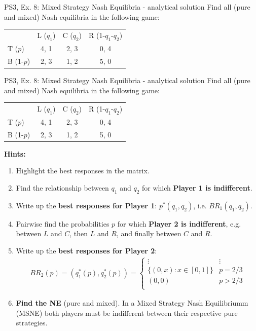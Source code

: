 \begin{frame}{PS3, Ex. 8: Mixed Strategy Nash Equilibria - analytical solution}
  Find all (pure and mixed) Nash equilibria in the following game:
    \begin{table}
      \begin{tabular}{l|c|c|c|}
          \multicolumn{1}{c}{}  & \multicolumn{1}{c}{L ($q_1$)} & \multicolumn{1}{c}{C ($q_2$)} & \multicolumn{1}{c}{R (1-$q_1$-$q_2$)} \\\cline{2-4}
          T ($p$)   & 4, 1 & 2, 3 & 0, 4 \\\cline{2-4}
          B (1-$p$) & 2, 3 & 1, 2 & 5, 0 \\\cline{2-4}
      \end{tabular}
    \end{table}
  \vfill\null
\end{frame}
\begin{frame}{PS3, Ex. 8: Mixed Strategy Nash Equilibria - analytical solution}
  Find all (pure and mixed) Nash equilibria in the following game:
    \begin{table}
      \begin{tabular}{l|c|c|c|}
          \multicolumn{1}{c}{}  & \multicolumn{1}{c}{L ($q_1$)} & \multicolumn{1}{c}{C ($q_2$)} & \multicolumn{1}{c}{R (1-$q_1$-$q_2$)} \\\cline{2-4}
          T ($p$)   & 4, 1 & 2, 3 & 0, 4 \\\cline{2-4}
          B (1-$p$) & 2, 3 & 1, 2 & 5, 0 \\\cline{2-4}
      \end{tabular}
    \end{table}
    \textbf{Hints:}
    \begin{enumerate}
      \item Highlight the best responses in the matrix.
      \item Find the relationship between $q_1$ and $q_2$ for which \textbf{Player 1 is indifferent}.
      \item Write up the \textbf{best responses for Player 1}: $p^{*}(q_1,q_2)$, i.e. $BR_1(q_1,q_2)$.
      \item Pairwise find the probabilities $p$ for which \textbf{Player 2 is indifferent}, e.g. between $L$ and $C$, then $L$ and $R$, and finally between $C$ and $R$.
      \item Write up the \textbf{best responses for Player 2}:
      \begin{align*}
        BR_2(p)=\left(q_1^{*}(p),q_2^{*}(p)\right)=\left\{ \begin{array}{ll}
            \vdots              & \vdots  \\
            \{(0,x):x\in[0,1]\} & p = 2/3 \\
            (0,0)               & p > 2/3 \\
        \end{array}\right.
      \end{align*}
      \item \textbf{Find the NE} (pure and mixed). In a Mixed Strategy Nash Equilibriumm (MSNE) both players must be indifferent between their respective pure strategies.
    \end{enumerate}
  \vfill\null
\end{frame}
